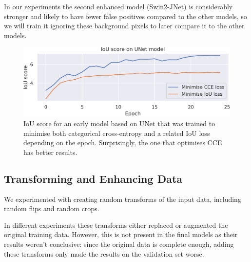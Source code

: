 In our experiments the second enhanced model (Swin2-JNet) is considerably stronger and likely to have fewer false positives compared to the other models, so we will train it ignoring these background pixels to later compare it to the other models.

\begin{figure}[b]
	\centering
	\includegraphics[width=.81\textwidth]{cce_vs_iou_loss.png}
	\caption{IoU score for an early model based on UNet that was trained to minimise both categorical cross-entropy and a related IoU loss depending on the epoch. Surprisingly, the one that optimises CCE has better results.}
	\label{iou_vs_cce}
\end{figure}

\subsection{Transforming and Enhancing Data}



We experimented with creating random transforms of the input data, including random flips and random crops.

In different experiments these transforms either replaced or augmented the original training data.
However, this is not present in the final models as their results weren't conclusive: since the original data is complete enough, adding these transforms only made the results on the validation set worse.

